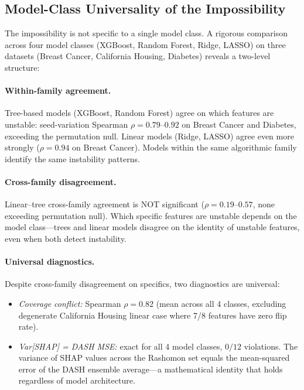 \documentclass[11pt,a4paper]{article}
\begin{document}
\subsection{Model-Class Universality of the Impossibility}
\label{sec:model-class}

The impossibility is not specific to a single model class.  A rigorous comparison across four model classes (XGBoost, Random Forest, Ridge, LASSO) on three datasets (Breast Cancer, California Housing, Diabetes) reveals a two-level structure:

\paragraph{Within-family agreement.}
Tree-based models (XGBoost, Random Forest) agree on which features are unstable: seed-variation Spearman $\rho = 0.79$--$0.92$ on Breast Cancer and Diabetes, exceeding the permutation null.  Linear models (Ridge, LASSO) agree even more strongly ($\rho = 0.94$ on Breast Cancer).  Models within the same algorithmic family identify the same instability patterns.

\paragraph{Cross-family disagreement.}
Linear--tree cross-family agreement is NOT significant ($\rho = 0.19$--$0.57$, none exceeding permutation null).  Which specific features are unstable depends on the model class---trees and linear models disagree on the identity of unstable features, even when both detect instability.

\paragraph{Universal diagnostics.}
Despite cross-family disagreement on specifics, two diagnostics are universal:
\begin{itemize}
  \item \emph{Coverage conflict:} Spearman $\rho = 0.82$ (mean across all 4 classes, excluding degenerate California Housing linear case where 7/8 features have zero flip rate).
  \item \emph{Var[SHAP] = DASH MSE:} exact for all 4 model classes, $0/12$ violations.  The variance of SHAP values across the Rashomon set equals the mean-squared error of the DASH ensemble average---a mathematical identity that holds regardless of model architecture.
\end{itemize}
\end{document}
